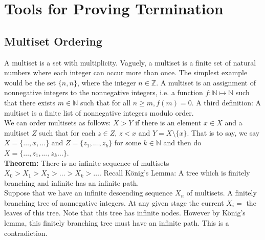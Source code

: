 \section{Tools for Proving Termination}
\subsection{Multiset Ordering}
A multiset is a set with multiplicity. Vaguely, a multiset is a finite set of natural numbers where each integer can occur more than once. The simplest example would be the set $\{n,n\}$, where the integer $n \in \mathbb{Z}$. A multiset is an assignment of nonnegative integers to the nonnegative integers, i.e. a function $f:\mathbb{N}\mapsto\mathbb{N}$ such that there exists $m \in \mathbb{N}$ such that for all $n \geq m, f(m) = 0$. A third definition: A multiset is a finite list of nonnegative integers modulo order.\\

We can order multisets as follows: $X > Y$ if there is an element $x \in X$ and a multiset $Z$ such that for each $z \in Z$, $z < x$ and $Y = X \setminus \{x\}$. That is to say, we say $X = \{\ldots,x,\ldots\}$ and $Z = \{z_1,\ldots,z_k\}$ for some $k \in \mathbb{N}$ and then do $X = \{\ldots,z_1,\ldots,z_k\ldots\}$.\\

\textbf{Theorem:} There is no infinite sequence of multisets $X_0 > X_1 > X_2 > \ldots > X_k > \ldots$. Recall K\"onig's Lemma: A tree which is finitely branching and infinite has an infinite path.\\

Suppose that we have an infinite descending sequence $X_n$ of multisets. A finitely branching tree of nonnegative integers. At any given stage the current $X_i = $ the leaves of this tree. Note that this tree has infinite nodes. However by K\"onig's lemma, this finitely branching tree must have an infinite path. This is a contradiction.\\